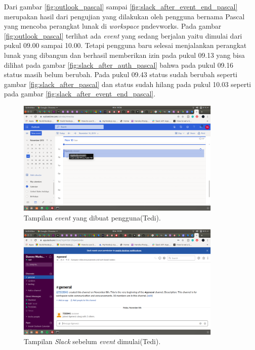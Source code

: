 Dari gambar \ref{fig:outlook_pascal} sampai \ref{fig:slack_after_event_end_pascal} merupakan hasil dari pengujian yang dilakukan oleh pengguna bernama Pascal yang mencoba perangkat lunak di \textit{workspace} pndevworks. Pada gambar \ref{fig:outlook_pascal} terlihat ada \textit{event} yang sedang berjalan yaitu dimulai dari pukul 09.00 sampai 10.00. Tetapi pengguna baru selesai menjalankan perangkat lunak yang dibangun dan berhasil memberikan izin pada pukul 09.13 yang bisa dilihat pada gambar \ref{fig:slack_after_auth_pascal} bahwa pada pukul 09.16 status masih belum berubah. Pada pukul 09.43 status sudah berubah seperti gambar \ref{fig:slack_after_pascal} dan status sudah hilang pada pukul 10.03 seperti pada gambar \ref{fig:slack_after_event_end_pascal}.  

\clearpage

\begin{figure}[h]
  \includegraphics[width=10cm]{./Gambar/PengujianTedi/Outlook.png}
  \centering
  \caption{Tampilan \textit{event} yang dibuat pengguna(Tedi).}
  \label{fig:outlook_tedi}
\end{figure}

\begin{figure}[h]
  \includegraphics[width=10cm]{./Gambar/PengujianTedi/Slack_Before.png}
  \centering
  \caption{Tampilan \textit{Slack} sebelum \textit{event} dimulai(Tedi).}
  \label{fig:slack_before_tedi}
\end{figure}

